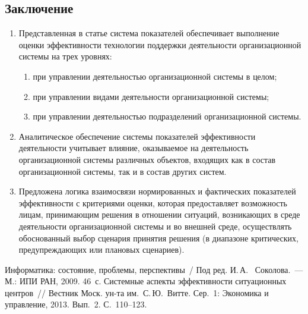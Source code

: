 \begin{multicols}{2}
\section*{Заключение}

\vspace*{-4pt}

     \noindent
     \begin{enumerate}[1.]
     \item  Представленная в статье система показателей обеспечивает выполнение
оценки эффективности технологии поддержки деятельности организационной
системы на трех уровнях:\\[-15pt]
     \begin{enumerate}[(1)]
\item  при управлении деятельностью организационной системы в целом;\\[-15pt]
\item при управлении видами деятельности организационной системы;\\[-15pt]
\item при управлении деятельностью подразделений организационной системы.\\[-15pt]
\end{enumerate}
     \item Аналитическое обеспечение системы показателей эффективности
деятельности учитывает влияние, оказываемое на деятельность организационной
системы различных объектов, входящих как в состав организационной системы, так
и в состав других систем.\\[-15pt]
\item  Предложена логика взаимосвязи нормированных и фактических показателей
эффективности с критериями оценки, которая предоставляет возможность лицам,
принимающим решения в отношении ситуаций, возникающих в среде деятельности
организационной системы и во внешней среде, осуществлять обоснованный выбор
сценария принятия решения (в диапазоне критических, предупреждающих или
плановых сценариев).
\end{enumerate}


{\small\frenchspacing
 {%
 \begin{thebibliography}{9}


Информатика: состояние, проблемы, перспективы~/ Под ред. И.\,А.~ Соколова.~---
М.: ИПИ РАН, 2009. 46~с.
 Системные аспекты эффективности
ситуационных центров~// Вестник Моск. ун-та им.\ С.\,Ю.~Витте. Сер.~1:
Экономика и управление, 2013. Вып.~2. С.~110--123.


\end{thebibliography}}}
\end{multicols}
